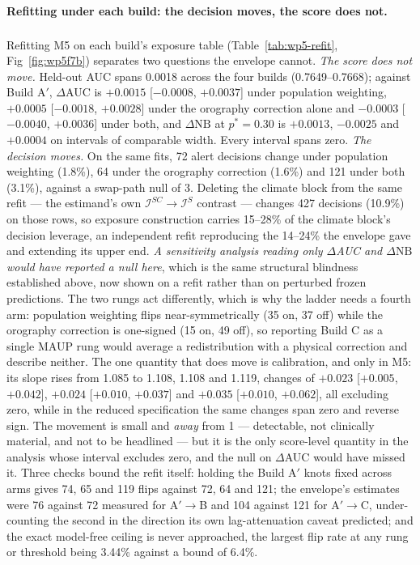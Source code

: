 \documentclass[11pt,a4paper]{article}
\providecommand{\REBUILD}{\textsuperscript{\ddag}}
\begin{document}
\paragraph{Refitting under each build: the decision moves, the score does not.}\REBUILD{} Refitting M5 on each build's exposure table (Table~\ref{tab:wp5-refit}, Fig~\ref{fig:wp5f7b}) separates two questions the envelope cannot. \emph{The score does not move.} Held-out AUC spans 0.0018 across the four builds (0.7649--0.7668); against Build A$'$, $\Delta$AUC is $+0.0015$ [$-0.0008$, $+0.0037$] under population weighting, $+0.0005$ [$-0.0018$, $+0.0028$] under the orography correction alone and $-0.0003$ [$-0.0040$, $+0.0036$] under both, and $\Delta\mathrm{NB}$ at $p^*=0.30$ is $+0.0013$, $-0.0025$ and $+0.0004$ on intervals of comparable width. Every interval spans zero. \emph{The decision moves.} On the same fits, 72 alert decisions change under population weighting (1.8\%), 64 under the orography correction (1.6\%) and 121 under both (3.1\%), against a swap-path null of 3. Deleting the climate block from the same refit --- the estimand's own $\mathcal I^{SC}\to\mathcal I^{S}$ contrast --- changes 427 decisions (10.9\%) on those rows, so exposure construction carries 15--28\% of the climate block's decision leverage, an independent refit reproducing the 14--24\% the envelope gave and extending its upper end. \emph{A sensitivity analysis reading only $\Delta$AUC and $\Delta\mathrm{NB}$ would have reported a null here}, which is the same structural blindness established above, now shown on a refit rather than on perturbed frozen predictions. The two rungs act differently, which is why the ladder needs a fourth arm: population weighting flips near-symmetrically (35 on, 37 off) while the orography correction is one-signed (15 on, 49 off), so reporting Build C as a single MAUP rung would average a redistribution with a physical correction and describe neither. The one quantity that does move is calibration, and only in M5: its slope rises from 1.085 to 1.108, 1.108 and 1.119, changes of $+0.023$ [$+0.005$, $+0.042$], $+0.024$ [$+0.010$, $+0.037$] and $+0.035$ [$+0.010$, $+0.062$], all excluding zero, while in the reduced specification the same changes span zero and reverse sign. The movement is small and \emph{away} from 1 --- detectable, not clinically material, and not to be headlined --- but it is the only score-level quantity in the analysis whose interval excludes zero, and the null on $\Delta$AUC would have missed it. Three checks bound the refit itself: holding the Build A$'$ knots fixed across arms gives 74, 65 and 119 flips against 72, 64 and 121; the envelope's estimates were 76 against 72 measured for A$'\to$B and 104 against 121 for A$'\to$C, under-counting the second in the direction its own lag-attenuation caveat predicted; and the exact model-free ceiling is never approached, the largest flip rate at any rung or threshold being 3.44\% against a bound of 6.4\%.
\end{document}
